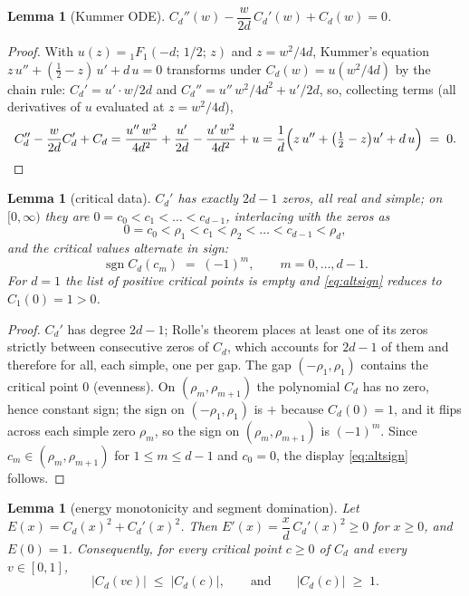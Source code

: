 \documentclass[11pt]{amsart}
\newtheorem{lemma}[theorem]{Lemma}
\theoremstyle{definition}
\theoremstyle{remark}
\DeclareMathOperator{\sgn}{sgn}
\newcommand{\hypF}[3]{{}_1F_1\!\left(#1;\,#2;\,#3\right)}
\begin{document}
\begin{lemma}[Kummer ODE]\label{lem:ode}
$C_d''(w)-\dfrac{w}{2d}\,C_d'(w)+C_d(w)=0$.
\end{lemma}

\begin{proof}
With $u(z)=\hypF{-d}{1/2}{z}$ and $z=w^2/4d$, Kummer's equation
$z\,u''+(\tfrac12-z)\,u'+d\,u=0$ \cite[Ch.~13]{dlmf} transforms under
$C_d(w)=u(w^2/4d)$ by the chain rule:
$C_d'=u'\cdot w/2d$ and
$C_d''=u''\,w^2/4d^2+u'/2d$, so, collecting terms (all derivatives of
$u$ evaluated at $z=w^2/4d$),
\[
C_d''-\frac{w}{2d}C_d'+C_d
=\frac{u''\,w^2}{4d^2}+\frac{u'}{2d}-\frac{u'\,w^2}{4d^2}+u
=\frac{1}{d}\Bigl(z\,u''+\bigl(\tfrac12-z\bigr)u'+d\,u\Bigr)
\;=\;0 . \qedhere
\]
\end{proof}

\begin{lemma}[critical data]\label{lem:critical}
$C_d'$ has exactly $2d-1$ zeros, all real and simple; on $[0,\infty)$
they are
$0=c_0<c_1<\dots<c_{d-1}$, interlacing with the zeros as
\[
0=c_0<\rho_1<c_1<\rho_2<\dots<c_{d-1}<\rho_d ,
\]
and the critical values alternate in sign:
\begin{equation}\label{eq:altsign}
\sgn C_d(c_m)\;=\;(-1)^m,\qquad m=0,\dots,d-1 .
\end{equation}
For $d=1$ the list of positive critical points is empty and
\eqref{eq:altsign} reduces to $C_1(0)=1>0$.
\end{lemma}

\begin{proof}
$C_d'$ has degree $2d-1$; Rolle's theorem places at least one of its
zeros strictly between consecutive zeros of $C_d$, which accounts for
$2d-1$ of them and therefore for all, each simple, one per gap. The
gap $(-\rho_1,\rho_1)$ contains the critical point $0$ (evenness). On
$(\rho_m,\rho_{m+1})$ the polynomial $C_d$ has no zero, hence constant
sign; the sign on $(-\rho_1,\rho_1)$ is $+$ because $C_d(0)=1$, and it
flips across each simple zero $\rho_m$, so the sign on
$(\rho_m,\rho_{m+1})$ is $(-1)^m$. Since
$c_m\in(\rho_m,\rho_{m+1})$ for $1\le m\le d-1$ and $c_0=0$, the
display \eqref{eq:altsign} follows.
\end{proof}

\begin{lemma}[energy monotonicity and segment domination]\label{lem:energy}
Let $E(x)=C_d(x)^2+C_d'(x)^2$. Then $E'(x)=\dfrac{x}{d}\,C_d'(x)^2\ge0$
for $x\ge 0$, and $E(0)=1$. Consequently, for every critical point
$c\ge 0$ of $C_d$ and every $v\in[0,1]$,
\begin{equation}\label{eq:domination}
|C_d(vc)|\;\le\;|C_d(c)| ,
\qquad\text{and}\qquad
|C_d(c)|\;\ge\;1 .
\end{equation}
\end{lemma}
\end{document}
